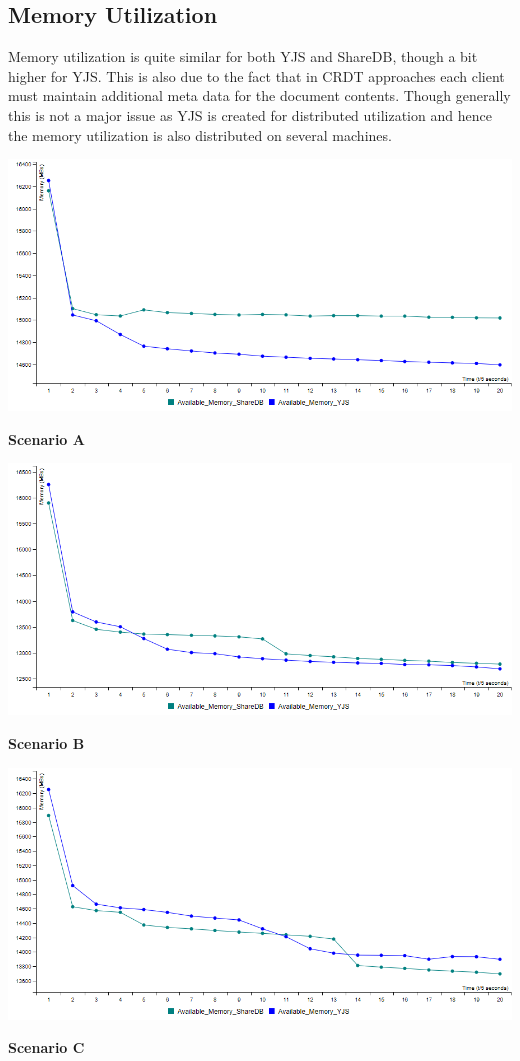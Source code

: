 \documentclass[12pt]{article}
\begin{document}
  \subsection{Memory Utilization}
  Memory utilization is quite similar for both YJS and ShareDB, though a bit higher for YJS. This is also due to the fact that
  in CRDT approaches each client must maintain additional meta data for the document contents. Though generally this is not a 
  major issue as YJS is created for distributed utilization and hence the memory utilization is also distributed on several machines.
  \begin{center}
    \includegraphics[scale=0.48]{scenario_a/memory.png}

    \textbf{Scenario A}
    
    \includegraphics[scale=0.48]{scenario_b/memory.png}
    
    \textbf{Scenario B}
    
    \includegraphics[scale=0.48]{scenario_c/memory.png}
    
    \textbf{Scenario C}

  \end{center}
\end{document}
